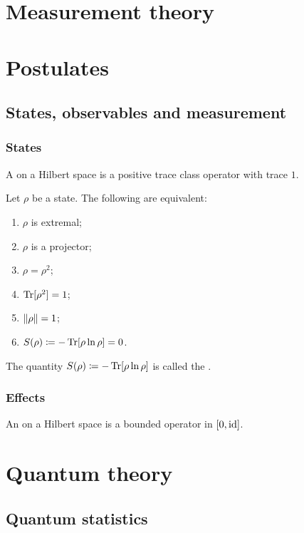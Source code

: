 \chapter{Measurement theory}

\chapter{Postulates}

\section{States, observables and measurement}
\subsection{States}
\begin{definition}
A  on a Hilbert space is a positive trace class operator with trace $1$.
\end{definition}

\begin{proposition}
Let $\rho$ be a state. The following are equivalent:
\begin{enumerate}
\item $\rho$ is extremal;
\item $\rho$ is a projector;
\item $\rho = \rho^2$;
\item $\operatorname{Tr}[\rho^2] = 1$;
\item $\lVert\rho\rVert = 1$;
\item $S(\rho) \coloneqq -\operatorname{Tr}[\rho\ln\rho] = 0$.
\end{enumerate}
\end{proposition}
The quantity $S(\rho) \coloneqq -\operatorname{Tr}[\rho\ln\rho]$ is called the .

\subsection{Effects}
\begin{definition}
An  on a Hilbert space is a bounded operator in $[0,\operatorname{id}]$.
\end{definition}

\chapter{Quantum theory}
\section{Quantum statistics}

